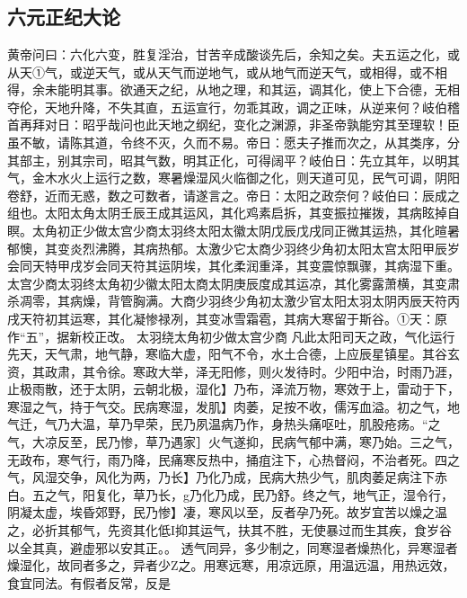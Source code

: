 \documentclass[a4paper,12pt,UTF8,twoside]{ctexbook}
\begin{document}
\part{}

\chapter{六元正纪大论}

黄帝问曰：六化六变，胜复淫治，甘苦辛成酸谈先后，余知之矣。夫五运之化，或从天①气，或逆天气，或从天气而逆地气，或从地气而逆天气，或相得，或不相得，余未能明其事。欲通天之纪，从地之理，和其运，调其化，使上下合德，无相夺伦，天地升降，不失其直，五运宣行，勿乖其政，调之正味，从逆来何？岐伯稽首再拜对日：昭乎哉问也此天地之纲纪，变化之渊源，非圣帝孰能穷其至理软！臣虽不敏，请陈其道，令终不灭，久而不易。帝日：愿夫子推而次之，从其类序，分其部主，别其宗司，昭其气数，明其正化，可得阔平？岐伯日：先立其年，以明其气，金木水火上运行之数，寒暑燥湿风火临御之化，则天道可见，民气可调，阴阳卷舒，近而无惑，数之可数者，请遂言之。帝日：太阳之政奈何？岐伯曰：辰成之组也。太阳太角太阴壬辰王成其运风，其化鸡素启拆，其变振拉摧拨，其病眩掉自瞑。太角初正少做太宫少商太羽终太阳太徽太阴戊辰戊戌同正微其运热，其化暄暑郁懊，其变炎烈沸腾，其病热郁。太激少它太商少羽终少角初太阳太宫太阳甲辰岁会同天特甲戌岁会同天符其运阴埃，其化柔润重泽，其变震惊飘骤，其病湿下重。太宫少商太羽终太角初少徽太阳太商太阴庚辰度成其运凉，其化雾露萧横，其变肃杀凋零，其病燥，背管胸满。大商少羽终少角初太激少官太阳太羽太阴丙辰天符丙戌天符初其运寒，其化凝惨禄冽，其变冰雪霜雹，其病大寒留于斯谷。①天：原作“五”，据新校正改。
太羽绕太角初少做太宫少商
凡此太阳司天之政，气化运行先天，天气肃，地气静，寒临大虚，阳气不令，水土合德，上应辰星镇星。其谷玄资，其政肃，其令徐。寒政大举，泽无阳修，则火发待时。少阳中治，时雨乃涯，止极雨散，还于太阴，云朝北极，湿化】乃布，泽流万物，寒效于上，雷动于下，寒湿之气，持于气交。民病寒湿，发肌】肉萎，足按不收，儒泻血溢。初之气，地气迁，气乃大温，草乃早荣，民乃夙温病乃作，身热头痛呕吐，肌股疮疡。“之气，大凉反至，民乃惨，草乃遇家］火气遂抑，民病气郁中满，寒乃始。三之气，无政布，寒气行，雨乃降，民痛寒反热中，捅疽注下，心热督闷，不治者死。四之气，风湿交争，风化为两，乃长】乃化乃成，民病大热少气，肌肉萎足病注下赤白。五之气，阳复化，草乃长，g乃化乃成，民乃舒。终之气，地气正，湿令行，阴凝太虚，埃昏郊野，民乃惨】凄，寒风以至，反者孕乃死。故岁宜苦以燥之温之，必折其郁气，先资其化低I抑其运气，扶其不胜，无使暴过而生其疾，食岁谷以全其真，避虚邪以安其正。。
透气同异，多少制之，同寒湿者燥热化，异寒湿者燥湿化，故同者多之，异者少Z之。用寒远寒，用凉远原，用温远温，用热远效，食宜同法。有假者反常，反是
\end{document}
